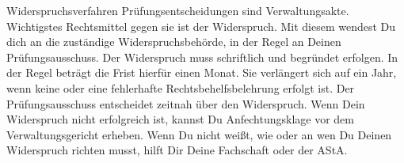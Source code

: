 \begin{artikel}{Widerspruchsverfahren}
Prüfungsentscheidungen sind Verwaltungsakte. Wichtigstes Rechtsmittel gegen sie ist der Widerspruch. Mit diesem wendest Du dich an die zuständige Widerspruchsbehörde, in der Regel an Deinen Prüfungsausschuss. Der Widerspruch muss schriftlich und begründet erfolgen. In der Regel beträgt die Frist hierfür einen Monat. Sie verlängert sich auf ein Jahr, wenn keine oder eine fehlerhafte Rechtsbehelfsbelehrung erfolgt ist. Der Prüfungsausschuss entscheidet zeitnah über den Widerspruch. Wenn Dein Widerspruch nicht erfolgreich ist, kannst Du Anfechtungsklage vor dem Verwaltungsgericht erheben. Wenn Du nicht weißt, wie oder an wen Du Deinen Widerspruch richten musst, hilft Dir Deine Fachschaft oder der AStA.
\end{artikel}
